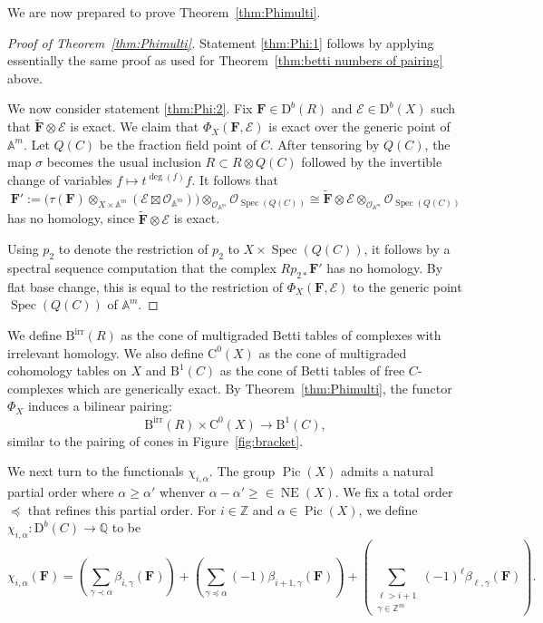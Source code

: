 \documentclass[12pt]{amsart}
\theoremstyle{definition}
\theoremstyle{remark}
\newcommand{\Spec}{\operatorname{Spec}}
\newcommand{\Pic}{\operatorname{Pic}}
\newcommand{\NE}{\operatorname{NE}}
\renewcommand{\AA}{\mathbb{A}}
\newcommand{\ZZ}{\mathbb{Z}}
\newcommand{\QQ}{\mathbb{Q}}
\newcommand{\cO}{\mathcal{O}}
\newcommand{\cE}{\mathcal{E}}
\newcommand{\FF}{\mathbf{F}}
\newcommand{\DD}{\mathrm{D}}
\newcommand{\CQ}{\mathrm{C}}
\newcommand{\BBQ}{\mathrm{B}}
\newcommand{\BBirr}{{\mathrm{B}}^{\text{irr}}}
\begin{document}
We are now prepared to prove Theorem~\ref{thm:Phimulti}.
\begin{proof}[Proof of Theorem~\ref{thm:Phimulti}]
Statement \eqref{thm:Phi:1} follows by applying essentially the same proof as used for Theorem~\ref{thm:betti numbers of pairing} above.  


We now consider statement \eqref{thm:Phi:2}. Fix $\FF\in \DD^b(R)$ and $\cE\in \DD^b(X)$ such that $\widetilde{\FF}\otimes \cE$ is exact.  We claim that $\Phi_X(\FF,\cE)$ is exact over the generic point of $\AA^m$.  Let $Q(C)$ be the fraction field point of $C$.  After tensoring by $Q(C)$, the map $\sigma$ becomes the usual inclusion $R\subset R\otimes Q(C)$ followed by the invertible change of variables $f\mapsto t^{\deg(f)}f$.  It follows that
\[
\FF':= \bigl(\tau(\FF)\otimes_{X\times\AA^{m}} (\cE\boxtimes \cO_{\AA^{m}}) \bigr)\otimes_{\cO_{\AA^m}} \cO_{\Spec(Q(C))}
 \cong
 \widetilde{\FF} \otimes \cE\otimes_{\cO_{\AA^m}} \cO_{\Spec(Q(C))}
\]
has no homology, since $\widetilde{\FF}\otimes \cE$ is exact.


Using $p_2$ to denote the restriction of $p_2$ to $X\times \Spec(Q(C))$, it follows by a spectral sequence computation that the complex $Rp_{2*}\FF'$ has no homology.  By flat base change, this is equal to the restriction of $\Phi_{X}(\FF,\cE)$ to the generic point $\Spec(Q(C))$ of $\AA^m$.
\end{proof}

We define $\BBirr(R)$ as the cone of multigraded Betti tables of complexes with irrelevant homology.  
We also define $\CQ^0(X)$ as the cone of multigraded cohomology tables on $X$ and $\BBQ^1(C)$ as the cone of Betti tables of free $C$-complexes
which are generically exact.
By Theorem~\ref{thm:Phimulti}, the functor $\Phi_{X}$ induces a bilinear pairing:
\[
\BBirr(R)\times \CQ^0(X)\to \BBQ^1(C),
\]
similar to the pairing of cones in Figure~\ref{fig:bracket}.  

We next turn to the functionals $\chi_{i,\alpha}$. The  group $\Pic(X)$ admits a natural partial order where $\alpha \geq \alpha'$ whenver $\alpha-\alpha'\geq \in \NE(X)$.  We fix a total order $\preceq$ that refines this partial order. For $i\in \ZZ$ and $\alpha\in \Pic(X)$,
we define $\chi_{i,\alpha}: \DD^b(C)\to \QQ$ to be
\[
\chi_{i,\alpha}(\FF)= \left(\sum_{\gamma\prec \alpha} \beta_{i,\gamma}(\FF) \right) +\left(\sum_{\gamma\preceq \alpha} (-1)\beta_{i+1,\gamma}(\FF)\right) + \left(\sum_{\substack{\ell > i+1\\ \gamma\in \ZZ^m}} (-1)^\ell\beta_{\ell,\gamma}(\FF) \right).
\]
\end{document}
